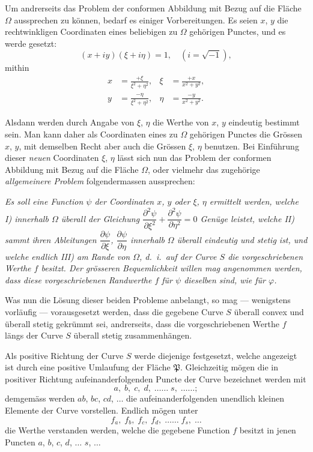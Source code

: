\documentclass{article}
\begin{document}
Um andrerseits das Problem der conformen Abbildung mit Bezug auf die Fläche $\Omega$ aussprechen zu können, bedarf es einiger Vorbereitungen. Es seien $x$, $y$ die rechtwinkligen Coordinaten eines beliebigen zu $\Omega$ gehörigen Punctes, und es werde gesetzt:
\[
(x+iy)(\xi+i\eta)=1, \quad (i=\sqrt{-1}),
\]
mithin
\[
\begin{aligned}
x &= \frac{+\xi}{\xi^{2}+\eta^{2}}, & \xi &= \frac{+x}{x^{2}+y^{2}},\\
y &= \frac{-\eta}{\xi^{2}+\eta^{2}}, & \eta &= \frac{-y}{x^{2}+y^{2}}.
\end{aligned}
\]

Alsdann werden durch Angabe von $\xi$, $\eta$ die Werthe von $x$, $y$ eindeutig bestimmt sein. Man kann daher als Coordinaten eines zu $\Omega$ gehörigen Punctes die Grössen $x$, $y$, mit demselben Recht aber auch die Grössen $\xi$, $\eta$ benutzen. Bei Einführung dieser \emph{neuen} Coordinaten $\xi$, $\eta$ lässt sich nun das Problem der conformen Abbildung mit Bezug auf die Fläche $\Omega$, oder vielmehr das zugehörige \emph{allgemeinere Problem} folgendermassen aussprechen:

\emph{Es soll eine Function $\psi$ der Coordinaten $x$, $y$ oder $\xi$, $\eta$ ermittelt werden, welche I) innerhalb $\Omega$ überall der Gleichung $\dfrac{\partial^{2}\psi}{\partial\xi^{2}}+\dfrac{\partial^{2}\psi}{\partial\eta^{2}}=0$ Genüge leistet, welche II) sammt ihren Ableitungen $\dfrac{\partial\psi}{\partial\xi}$, $\dfrac{\partial\psi}{\partial\eta}$ innerhalb $\Omega$ überall eindeutig und stetig ist, und welche endlich III) am Rande von $\Omega$, d.\ i.\ auf der Curve $S$ die vorgeschriebenen Werthe $f$ besitzt. Der grösseren Bequemlichkeit willen mag angenommen werden, dass diese vorgeschriebenen Randwerthe $f$ für $\psi$ dieselben sind, wie für $\varphi$.}

Was nun die Lösung dieser beiden Probleme anbelangt, so mag --- wenigstens vorläufig --- vorausgesetzt werden, dass die gegebene Curve $S$ überall convex und überall stetig gekrümmt
sei, andrerseits, dass die vorgeschriebenen Werthe $f$ längs der Curve $S$ überall stetig zusammenhängen.

Als positive Richtung der Curve $S$ werde diejenige festgesetzt, welche angezeigt ist durch eine positive Umlaufung der Fläche $\mathfrak{P}$. Gleichzeitig mögen die in positiver Richtung aufeinanderfolgenden Puncte der Curve bezeichnet werden mit
\[
a,\; b,\; c,\; d,\; \ldots\ldots\; s,\; \ldots\ldots;
\]
demgemäss werden $ab$, $bc$, $cd$, $\ldots$ die aufeinanderfolgenden unendlich kleinen Elemente der Curve vorstellen. Endlich mögen unter
\[
f_{a},\; f_{b},\; f_{c},\; f_{d},\; \ldots\ldots\; f_{s},\; \ldots
\]
die Werthe verstanden werden, welche die gegebene Function $f$ besitzt in jenen Puncten $a$, $b$, $c$, $d$, $\ldots$ $s$, $\ldots$
\end{document}
